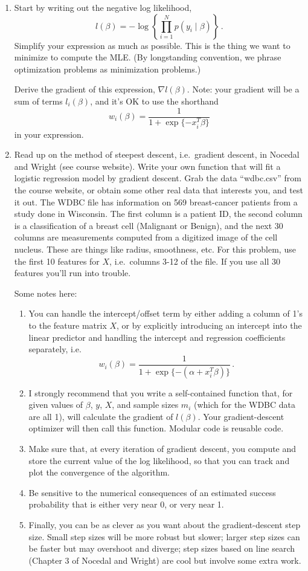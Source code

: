 \documentclass{article}
\begin{document}
\begin{enumerate}[label=(\Alph*)]
\item Start by writing out the negative log likelihood,
$$
l(\beta) = - \log \left \{ \prod_{i=1}^N p(y_i \mid \beta) \right \} \, .
$$
Simplify your expression as much as possible. This is the thing we want to minimize to compute the MLE.  (By longstanding convention, we phrase optimization problems as minimization problems.)

Derive the gradient of this expression, $\nabla l(\beta)$.   Note: your gradient will be a sum of terms $l_i(\beta)$, and it's OK to use the shorthand
$$
w_i(\beta) =  \frac{1}{1 + \exp\{-x_i^T \beta\}}
$$
in your expression.


\item Read up on the method of steepest descent, i.e.~gradient descent, in Nocedal and Wright (see course website).  Write your own function that will fit a logistic regression model by gradient descent.  Grab the data ``wdbc.csv'' from the course website, or obtain some other real data that interests you, and test it out.  The WDBC file has information on 569 breast-cancer patients from a study done in Wisconsin.  The first column is a patient ID, the second column is a classification of a breast cell (Malignant or Benign), and the next 30 columns are measurements computed from a digitized image of the cell nucleus.  These are things like radius, smoothness, etc.  For this problem, use the first 10 features for $X$, i.e.~columns 3-12 of the file.  If you use all 30 features you'll run into trouble.

Some notes here:
\begin{enumerate}
\item You can handle the intercept/offset term by either adding a column of 1's to the feature matrix $X$, or by explicitly introducing an intercept into the linear predictor and handling the intercept and regression coefficients separately, i.e.
$$
w_i(\beta) =  \frac{1}{1 + \exp\{-(\alpha + x_i^T \beta )\}} \, .
$$
\item I strongly recommend that you write a self-contained function that, for given values of $\beta$, $y$, $X$, and sample sizes $m_i$ (which for the WDBC data are all 1), will calculate the gradient of $l(\beta)$.  Your gradient-descent optimizer will then call this function.  Modular code is reusable code.
\item Make sure that, at every iteration of gradient descent, you compute and store the current value of the log likelihood, so that you can track and plot the convergence of the algorithm.
\item Be sensitive to the numerical consequences of an estimated success probability that is either very near 0, or very near 1.
\item Finally, you can be as clever as you want about the gradient-descent step size.  Small step sizes will be more robust but slower; larger step sizes can be faster but may overshoot and diverge; step sizes based on line search (Chapter 3 of Nocedal and Wright) are cool but involve some extra work.
\end{enumerate}



\end{enumerate}
\end{document}
